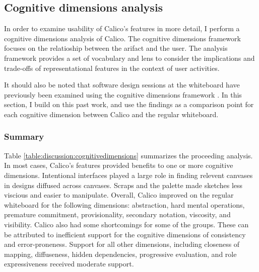\subsection{Cognitive dimensions analysis}



In order to examine usability of Calico's features in more detail, I perform a cognitive dimensions analysis \cite{Green96usabilityanalysis} of Calico. The cognitive dimensions framework focuses on the relatioship between the arifact and the user. The analysis framework provides a set of vocabulary and lens to consider the implications and trade-offs of representational features in the context of user activities. 

It should also be noted that software design sessions at the whiteboard have previously been examined using the cognitive dimensions framework \citep{Petre2013BookChapter}. In this section, I build on this past work, and use the findings as a comparison point for each cognitive dimension between Calico and the regular whiteboard.

\subsubsection{Summary}
Table \ref{table:discussion:cognitivedimensions} summarizes the proceeding analysis. In most cases, Calico's features provided benefits to one or more cognitive dimensions. Intentional interfaces played a large role in finding relevent canvases in designs diffused across canvases. Scraps and the palette made sketches less viscious and easier to manipulate. Overall, Calico improved on the regular whiteboard for the following dimensions: abstraction, hard mental operations, premature commitment, provisionality, secondary notation, viscosity, and visibility. Calico also had some shortcomings for some of the groups. These can be attributed to inefficient support for the cognitive dimensions of consistency and error-proneness. Support for all other dimensions, including closeness of mapping, diffuseness, hidden dependencies, progressive evaluation, and role expressiveness received moderate support.

